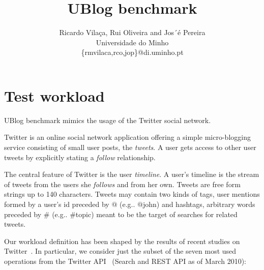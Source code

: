 \documentclass[12pt]{article}
\begin{document}
\title{UBlog benchmark}
\author{Ricardo Vila\c{c}a, Rui Oliveira and Jos´\'{e} Pereira\\
Universidade do Minho\\
\{rmvilaca,rco,jop\}@di.uminho.pt}


\maketitle

\thispagestyle{empty}


\section{Test workload}
\label{sec:workload}

UBlog benchmark mimics the usage of the Twitter social network. 

Twitter is an online social network application offering a simple
micro-blogging service consisting of small user posts,
the \emph{tweets}. A user gets access to other user tweets by explicitly stating a \emph{follow} relationship.

The central feature of Twitter is the user \emph{timeline}. A user's timeline
is the stream of tweets from the users she \emph{follows} and from her own.
Tweets are free form strings up to 140 characters. Tweets may contain two
kinds of tags, user mentions formed by a user's id preceded by $@$ (e.g..
$@$john) and hashtags, arbitrary words preceded by $\#$ (e.g.. $\#$topic) meant
to be the target of searches for related tweets.

Our workload definition has been shaped by the results of recent studies on
Twitter~\cite{whyWeTwitter,chipsTwitter,retweet}. In particular, we consider
just the subset of the seven most used operations from the Twitter
API~\cite{twitterAPI} (Search and REST API as of March 2010):

~
\end{document}
